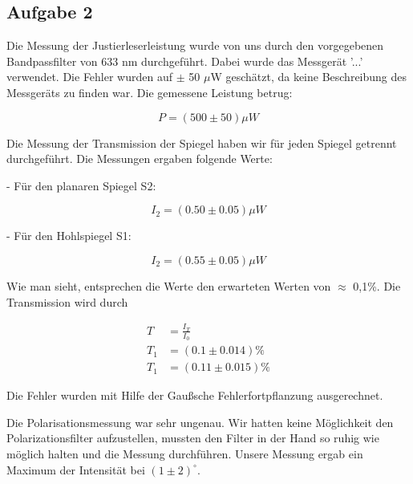 \subsection{Aufgabe 2}

Die Messung der Justierleserleistung wurde von uns durch den vorgegebenen Bandpassfilter von 633 nm durchgeführt. Dabei wurde das Messgerät '...' verwendet. Die Fehler wurden auf $\pm$ 50 $\mu$W geschätzt, da keine Beschreibung des Messgeräts zu finden war. Die gemessene Leistung betrug:

\begin{equation}
P = (500 \pm 50) \mu W
\end{equation}

Die Messung der Transmission der Spiegel haben wir für jeden Spiegel getrennt durchgeführt. Die Messungen ergaben folgende Werte:

- Für den planaren Spiegel S2:

\begin{equation}
I_{2} = (0.50 \pm 0.05) \mu W
\end{equation}

- Für den Hohlspiegel S1:

\begin{equation}
	I_{2} = (0.55 \pm 0.05) \mu W
\end{equation}

Wie man sieht, entsprechen die Werte den erwarteten Werten von $\approx$ 0,1\%. Die Transmission wird durch 

\begin{align}
	T &= \frac{I_{T}}{I_{0}} \\
	T_{1} &= (0.1 \pm 0.014)\% \\
	T_{1} &= (0.11 \pm 0.015)\%
\end{align}

Die Fehler wurden mit Hilfe der Gaußsche Fehlerfortpflanzung ausgerechnet.

Die Polarisationsmessung war sehr ungenau. Wir hatten keine Möglichkeit den Polarizationsfilter aufzustellen, mussten den Filter in der Hand so ruhig wie möglich halten und die Messung durchführen. Unsere Messung ergab ein Maximum der Intensität bei $(1 \pm 2)^{\circ}$.